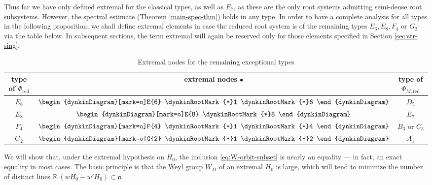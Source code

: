 \documentclass[12pt]{amsart}
\theoremstyle{remark}
\newcommand{\R}{\mathbb R}
\newcommand{\ga}{\mathfrak a}
\begin{document}
Thus far we have only defined extremal for the classical types, as well as $E_7$, as these are the only root systems admitting semi-dense root subsystems. However, the spectral estimate (Theorem \ref{main-spec-thm}) holds in any type. In order to have a complete analysis for all types in the following proposition, we shall define extremal elements in case the reduced root system is of the remaining types $E_6, E_8, F_4$ or $G_2$ via the table below. In subsequent sections, the term extremal will again be reserved only for those elements specified in Section \ref{sec:str-sing}. 

\begin{table}[H]
 \begin{tabular}{|c|c|c|}
 \hline
 type of $\Phi_{\text{red}}$ & extremal nodes $\bullet$ & type of $\Phi_{M, \text{red}}$ \\ \hline
  $E_6$ & $\begin{dynkinDiagram}[mark=o]E{6} 
\dynkinRootMark{*}1 \dynkinRootMark{*}6 \end{dynkinDiagram}$ &$D_5$\\ 
  $E_8$ & $\begin{dynkinDiagram}[mark=o]E{8} 
\dynkinRootMark{*}8 \end{dynkinDiagram}$ & $E_7$\\
  $F_4$ & $\begin{dynkinDiagram}[mark=o]F{4} 
\dynkinRootMark{*}1 \dynkinRootMark{*}4 \end{dynkinDiagram}$ & $B_3$ or $C_3$\\
  $G_2$ & $\begin{dynkinDiagram}[mark=o]G{2} 
\dynkinRootMark{*}1 \dynkinRootMark{*}2 \end{dynkinDiagram}$ & $A_1$\\
\hline
 \end{tabular}
 \bigskip
 \caption{Extremal nodes for the remaining exceptional types}
\end{table}


We will show that, under the extremal hypothesis on $H_0$, the inclusion \eqref{eq:W-orbit-subset} is nearly an equality --- in fact, an exact equality in most cases. The basic principle is that the Weyl group $W_M$ of an extremal $H_0$ is large, which will tend to minimize the number of distinct lines $\R.(wH_0-w'H_0)\subset\ga$.

\end{document}
